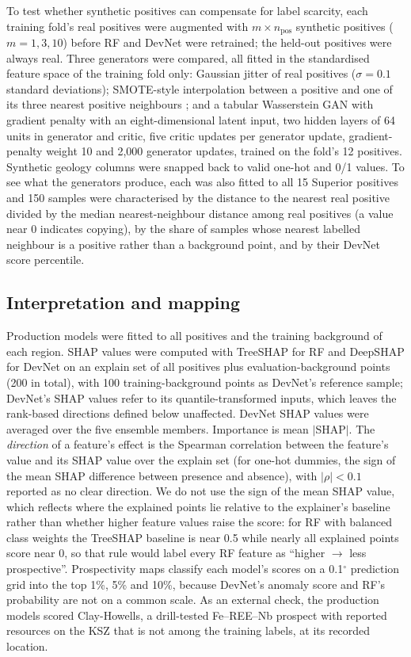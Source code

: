 \documentclass[pdflatex,sn-apa]{sn-jnl}
\begin{document}
To test whether synthetic positives can compensate for label scarcity, each training fold's real positives were augmented with $m \times n_{\mathrm{pos}}$ synthetic positives ($m = 1, 3, 10$) before RF and DevNet were retrained; the held-out positives were always real. Three generators were compared, all fitted in the standardised feature space of the training fold only: Gaussian jitter of real positives ($\sigma = 0.1$ standard deviations); SMOTE-style interpolation between a positive and one of its three nearest positive neighbours \citep{Chawla2002}; and a tabular Wasserstein GAN with gradient penalty \citep[WGAN-GP;][]{Goodfellow2014,Arjovsky2017,Gulrajani2017} with an eight-dimensional latent input, two hidden layers of 64 units in generator and critic, five critic updates per generator update, gradient-penalty weight 10 and 2,000 generator updates, trained on the fold's 12 positives. Synthetic geology columns were snapped back to valid one-hot and 0/1 values. To see what the generators produce, each was also fitted to all 15 Superior positives and 150 samples were characterised by the distance to the nearest real positive divided by the median nearest-neighbour distance among real positives (a value near 0 indicates copying), by the share of samples whose nearest labelled neighbour is a positive rather than a background point, and by their DevNet score percentile.

\subsection{Interpretation and mapping}\label{sec:shap}

Production models were fitted to all positives and the training background of each region. SHAP values \citep{Lundberg2017} were computed with TreeSHAP for RF \citep{Lundberg2020} and DeepSHAP for DevNet on an explain set of all positives plus evaluation-background points (200 in total), with 100 training-background points as DevNet's reference sample; DevNet's SHAP values refer to its quantile-transformed inputs, which leaves the rank-based directions defined below unaffected. DevNet SHAP values were averaged over the five ensemble members. Importance is mean $|$SHAP$|$. The \emph{direction} of a feature's effect is the Spearman correlation between the feature's value and its SHAP value over the explain set (for one-hot dummies, the sign of the mean SHAP difference between presence and absence), with $|\rho| < 0.1$ reported as no clear direction. We do not use the sign of the mean SHAP value, which reflects where the explained points lie relative to the explainer's baseline rather than whether higher feature values raise the score: for RF with balanced class weights the TreeSHAP baseline is near 0.5 while nearly all explained points score near 0, so that rule would label every RF feature as ``higher $\rightarrow$ less prospective''. Prospectivity maps classify each model's scores on a 0.1$^\circ$ prediction grid into the top 1\%, 5\% and 10\%, because DevNet's anomaly score and RF's probability are not on a common scale. As an external check, the production models scored Clay-Howells, a drill-tested Fe--REE--Nb prospect with reported resources on the KSZ \citep{OGS2011} that is not among the training labels, at its recorded location.
\end{document}
